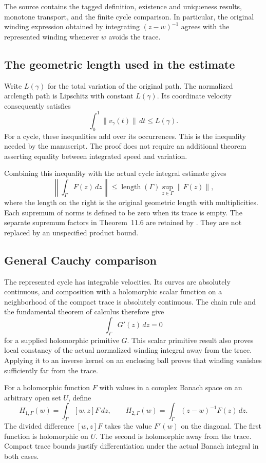 The source  contains the tagged definition, existence and uniqueness results, monotone transport, and the finite cycle comparison. In particular, the original winding expression obtained by integrating $(z-w)^{-1}$ agrees with the represented winding whenever $w$ avoids the trace.

\subsection{The geometric length used in the estimate}

Write $L(\gamma)$ for the total variation of the original path. The normalized arclength path is Lipschitz with constant $L(\gamma)$. Its coordinate velocity consequently satisfies
\[
 \int_0^1\|v_\gamma(t)\|\,dt\leq L(\gamma).
\]
For a cycle, these inequalities add over its occurrences. This is the inequality needed by the manuscript. The proof does not require an additional theorem asserting equality between integrated speed and variation.

Combining this inequality with the actual cycle integral estimate gives
\[
 \left\|\int_\Gamma F(z)\,dz\right\|
 \leq \operatorname{length}(\Gamma)
       \sup_{z\in\Gamma}\|F(z)\|,
\]
where the length on the right is the original geometric length with multiplicities. Each supremum of norms is defined to be zero when its trace is empty. The separate supremum factors in Theorem~11.6 are retained by . They are not replaced by an unspecified product bound.

\subsection{General Cauchy comparison}

The represented cycle has integrable velocities. Its curves are absolutely continuous, and composition with a holomorphic scalar function on a neighborhood of the compact trace is absolutely continuous. The chain rule and the fundamental theorem of calculus therefore give
\[
 \int_\Gamma G'(z)\,dz=0
\]
for a supplied holomorphic primitive $G$. This scalar primitive result also proves local constancy of the actual normalized winding integral away from the trace. Applying it to an inverse kernel on an enclosing ball proves that winding vanishes sufficiently far from the trace.

For a holomorphic function $F$ with values in a complex Banach space on an arbitrary open set $U$, define
\[
 H_{1,\Gamma}(w)=\int_\Gamma [w,z]F\,dz,
 \qquad
 H_{2,\Gamma}(w)=\int_\Gamma (z-w)^{-1}F(z)\,dz.
\]
The divided difference $[w,z]F$ takes the value $F'(w)$ on the diagonal. The first function is holomorphic on $U$. The second is holomorphic away from the trace. Compact trace bounds justify differentiation under the actual Banach integral in both cases.

